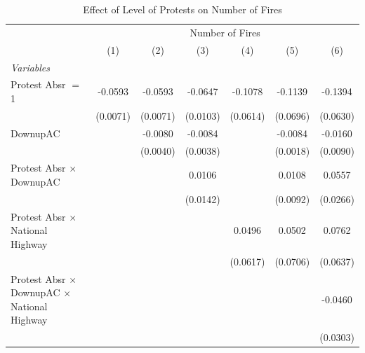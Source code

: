 
\begin{table}[htbp]
   \caption{\label{tab:protest_treat_main} Effect of Level of Protests on Number of Fires}
   \centering
   \begin{tabular}{lcccccc}
      \tabularnewline \midrule \midrule
       & \multicolumn{6}{c}{Number of Fires}\\
                                                                 & (1)           & (2)           & (3)           & (4)           & (5)           & (6)\\  
      \midrule
      \emph{Variables}\\
      Protest Absr $=$ 1                                         & -0.0593       & -0.0593       & -0.0647       & -0.1078       & -0.1139       & -0.1394\\   
                                                                 & (0.0071)      & (0.0071)      & (0.0103)      & (0.0614)      & (0.0696)      & (0.0630)\\   
      DownupAC                                                   &               & -0.0080       & -0.0084       &               & -0.0084       & -0.0160\\   
                                                                 &               & (0.0040)      & (0.0038)      &               & (0.0018)      & (0.0090)\\   
      Protest Absr $\times$ DownupAC                             &               &               & 0.0106        &               & 0.0108        & 0.0557\\   
                                                                 &               &               & (0.0142)      &               & (0.0092)      & (0.0266)\\   
      Protest Absr $\times$ National Highway                     &               &               &               & 0.0496        & 0.0502        & 0.0762\\   
                                                                 &               &               &               & (0.0617)      & (0.0706)      & (0.0637)\\   
      Protest Absr $\times$ DownupAC $\times$ National Highway   &               &               &               &               &               & -0.0460\\   
                                                                 &               &               &               &               &               & (0.0303)\\   

\end{tabular}
\end{table}
